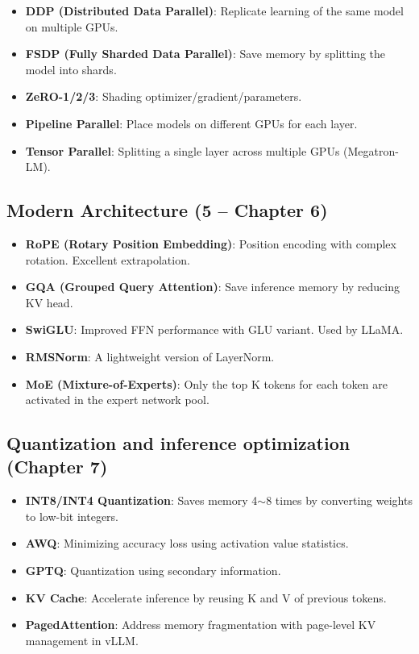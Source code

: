 \begin{itemize}
\item\textbf{DDP (Distributed Data Parallel)}: Replicate learning of the same model on multiple GPUs.
\item\textbf{FSDP (Fully Sharded Data Parallel)}: Save memory by splitting the model into shards.
\item\textbf{ZeRO-1/2/3}: Shading optimizer/gradient/parameters.
\item\textbf{Pipeline Parallel}: Place models on different GPUs for each layer.
\item\textbf{Tensor Parallel}: Splitting a single layer across multiple GPUs (Megatron-LM).
\end{itemize}

\subsection{Modern Architecture (5  --  Chapter 6)}

\begin{itemize}
\item\textbf{RoPE (Rotary Position Embedding)}: Position encoding with complex rotation. Excellent extrapolation.
\item\textbf{GQA (Grouped Query Attention)}: Save inference memory by reducing KV head.
\item\textbf{SwiGLU}: Improved FFN performance with GLU variant. Used by LLaMA.
\item\textbf{RMSNorm}: A lightweight version of LayerNorm.
\item\textbf{MoE (Mixture-of-Experts)}: Only the top K tokens for each token are activated in the expert network pool.
\end{itemize}

\subsection{Quantization and inference optimization (Chapter 7)}

\begin{itemize}
\item\textbf{INT8/INT4 Quantization}: Saves memory 4$\sim$8 times by converting weights to low-bit integers.
\item\textbf{AWQ}: Minimizing accuracy loss using activation value statistics.
\item\textbf{GPTQ}: Quantization using secondary information.
\item\textbf{KV Cache}: Accelerate inference by reusing K and V of previous tokens.
\item\textbf{PagedAttention}: Address memory fragmentation with page-level KV management in vLLM.
\end{itemize}

